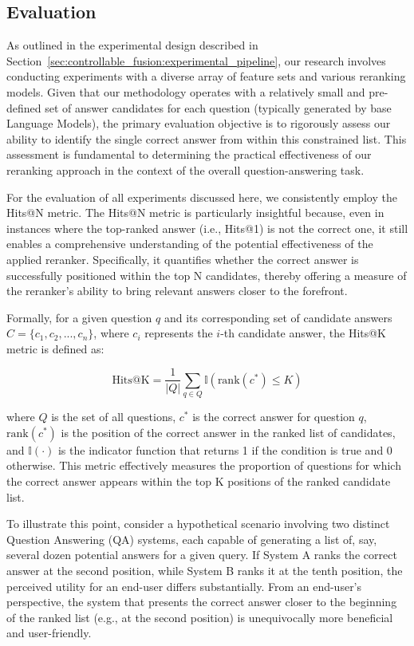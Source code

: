 \subsection{Evaluation} \label{sec:controllable_fusion:evaluation}

As outlined in the experimental design described in Section~\ref{sec:controllable_fusion:experimental_pipeline}, our research involves conducting experiments with a diverse array of feature sets and various reranking models. Given that our methodology operates with a relatively small and pre-defined set of answer candidates for each question (typically generated by base Language Models), the primary evaluation objective is to rigorously assess our ability to identify the single correct answer from within this constrained list. This assessment is fundamental to determining the practical effectiveness of our reranking approach in the context of the overall question-answering task.

For the evaluation of all experiments discussed here, we consistently employ the {Hits@N} metric. The {Hits@N} metric is particularly insightful because, even in instances where the top-ranked answer (i.e., Hits@1) is not the correct one, it still enables a comprehensive understanding of the potential effectiveness of the applied reranker. Specifically, it quantifies whether the correct answer is successfully positioned within the top N candidates, thereby offering a measure of the reranker's ability to bring relevant answers closer to the forefront.

Formally, for a given question $q$ and its corresponding set of candidate answers $C = \{c_1, c_2, ..., c_n\}$, where $c_i$ represents the $i$-th candidate answer, the Hits@K metric is defined as:

\begin{equation}
    \text{Hits@K} = \frac{1}{|Q|} \sum_{q \in Q} \mathbb{I}(\text{rank}(c^*) \leq K)
\end{equation}

where $Q$ is the set of all questions, $c^*$ is the correct answer for question $q$, $\text{rank}(c^*)$ is the position of the correct answer in the ranked list of candidates, and $\mathbb{I}(\cdot)$ is the indicator function that returns 1 if the condition is true and 0 otherwise. This metric effectively measures the proportion of questions for which the correct answer appears within the top K positions of the ranked candidate list.

To illustrate this point, consider a hypothetical scenario involving two distinct Question Answering (QA) systems, each capable of generating a list of, say, several dozen potential answers for a given query. If System A ranks the correct answer at the second position, while System B ranks it at the tenth position, the perceived utility for an end-user differs substantially. From an end-user's perspective, the system that presents the correct answer closer to the beginning of the ranked list (e.g., at the second position) is unequivocally more beneficial and user-friendly.

